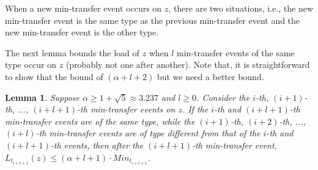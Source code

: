 \documentclass[a4paper]{article}
\newtheorem{lemma}{Lemma}
\begin{document}
When a new min-transfer event occurs on $z$, there are two
situations, i.e., the new min-transfer event is the same type as the
previous min-transfer event and the new min-transfer event is the
other type.

The next lemma bounds the load of $z$ when $l$ min-transfer events of
the same type occur on $z$ (probably not one after another).  Note
that, it is straightforward to show that the bound of $(\alpha+l+2)$
but we need a better bound.


\begin{lemma}
  \label{lem:genneralizemintransfer}
  Suppose $\alpha \geq 1+\sqrt{5}\approx 3.237$ and $l\geq
  0$. Consider the $i$-th, $(i+1)$-th, ..., $(i+l+1)$-th min-transfer
  events on $z$. If the $i$-th and  $(i+l+1)$-th
  min-transfer events are of the same type, while the $(i+1)$-th,
  $(i+2)$-th, ..., $(i+l)$-th min-transfer events are of type
  different from that of the $i$-th and  $(i+l+1)$-th events, then
  after the $(i+l+1)$-th min-transfer event, $L_{t_{i+l+1}}(z)\leq
  (\alpha+l+1)\cdot Min_{t_{i+l+1}}$.
\end{lemma}
\end{document}
